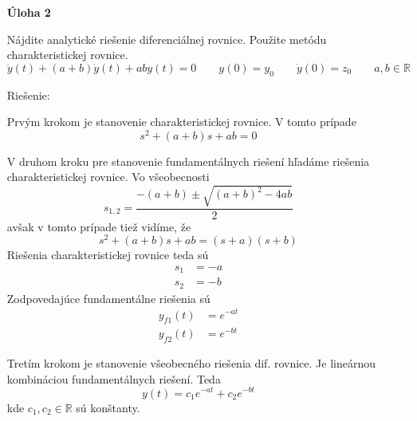 \documentclass[a4paper, 10pt, ]{article}
\begin{document}
\begin{itemize}[leftmargin=0pt, labelsep=3mm, itemsep=0pt]
    

    \item[\textsf{\bfseries Úloha 2}] {\sffamily%
    Nájdite analytické riešenie diferenciálnej rovnice. Použite metódu charakteristickej rovnice.
	\begin{equation*} 
        \ddot y(t) + (a+b) \dot y(t) + a b y(t) = 0  \qquad y(0) = y_0 \qquad \dot y(0) = z_0 \qquad a,b \in \mathbb{R}
    \end{equation*}
    
    Riešenie:}

    Prvým krokom je stanovenie charakteristickej rovnice. V tomto prípade
    \begin{equation}
        s^2 + (a+b) s + a b = 0 
    \end{equation}

    V druhom kroku pre stanovenie fundamentálnych riešení hľadáme riešenia charakteristickej rovnice. Vo všeobecnosti
    \begin{equation}
        s_{1,2} = \frac{-(a + b) \pm \sqrt{(a + b)^2 - 4  ab}}{2}
    \end{equation}
    avšak v tomto prípade tiež vidíme, že
    \begin{equation}
        s^2 + (a+b) s + a b = (s + a)(s + b)
    \end{equation}
    Riešenia charakteristickej rovnice teda sú
    \begin{subequations}
        \begin{align}
            s_1 &= -a \\
            s_2 &= -b
        \end{align}
    \end{subequations}
    Zodpovedajúce fundamentálne riešenia sú
    \begin{subequations}
        \begin{align}
            y_{f1}(t) &= e^{-at} \\
            y_{f2}(t) &= e^{-bt}
        \end{align}
    \end{subequations}

    Tretím krokom je stanovenie všeobecného riešenia dif. rovnice. Je lineárnou kombináciou fundamentálnych riešení. Teda
    \begin{equation}
        y(t) = c_1 e^{-at} + c_2 e^{-bt}
    \end{equation}
    kde $c_1, c_2 \in \mathbb{R}$ sú konštanty.


\end{itemize}
\end{document}

